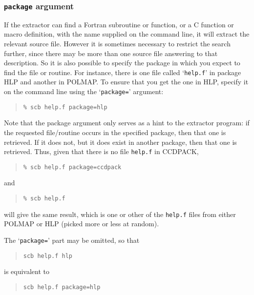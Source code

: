 \documentclass[twoside,11pt]{article}
\newcommand{\xlabel}[1]{}
\renewcommand{\_}{\texttt{\symbol{95}}}
\begin{document}
\subsubsection{\xlabel{sec:extract-package}\label{sec:extract-package}{\tt package} argument}

If the extractor can find a Fortran subroutine or function, 
or a C function or macro definition, with the name supplied on
the command line, it will extract the relevant source file.
However it is sometimes necessary to restrict the search
further, since there may be more than one source file answering
to that description.  So it is also possible to specify the
package in which you expect to find the file or routine. 
For instance, there is one file called `{\tt help.f}' in
package HLP and another in POLMAP.  
To ensure that you get the one in HLP, specify it on the 
command line using the `{\tt package=}' argument:
\begin{quote}
\begin{verbatim}
% scb help.f package=hlp
\end{verbatim}
\end{quote}
Note that the package argument only serves as a hint to the
extractor program: if the requested file/routine occurs in the
specified package, then that one is retrieved.  If it does not,
but it does exist in another package, then that one is retrieved.
Thus, given that there is no file {\tt help.f} in CCDPACK,
\begin{quote}
\begin{verbatim}
% scb help.f package=ccdpack
\end{verbatim}
\end{quote}
and 
\begin{quote}
\begin{verbatim}
% scb help.f
\end{verbatim}
\end{quote}
will give the same result, which is one or other of the {\tt help.f}
files from either POLMAP or HLP (picked more or less at random).

The `{\tt package=}' part may be omitted, so that 
\begin{quote}
\begin{verbatim}
scb help.f hlp
\end{verbatim}
\end{quote}
is equivalent to 
\begin{quote}
\begin{verbatim}
scb help.f package=hlp
\end{verbatim}
\end{quote}
\end{document}

